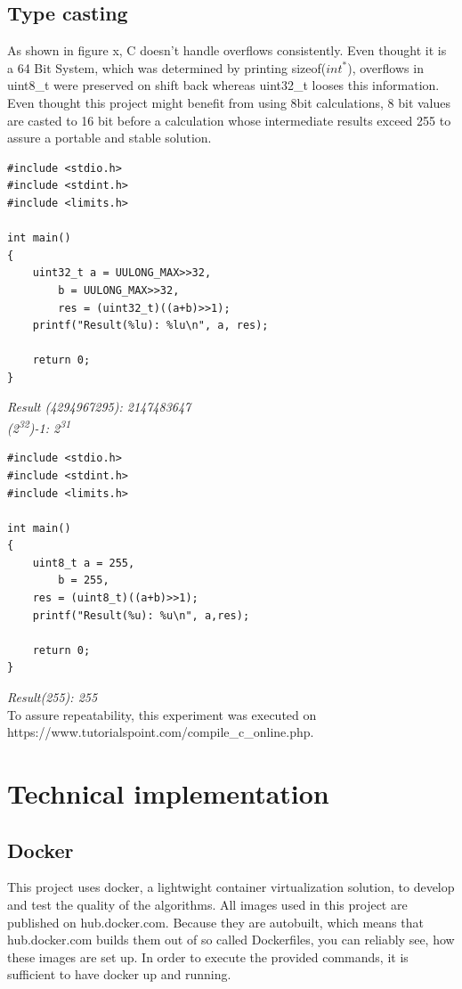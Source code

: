\section{Type casting}
As shown in figure x, C doesn't handle overflows consistently. Even thought it is a 64 Bit System, which was determined by printing sizeof($int^*$), overflows in uint8\_t were preserved on shift back whereas uint32\_t looses this information. Even thought this project might benefit from using 8bit calculations, 8 bit values are casted to 16 bit before a calculation whose intermediate results exceed 255 to assure a portable and stable solution.

\begin{verbatim}
#include <stdio.h>
#include <stdint.h>
#include <limits.h>

int main()
{
	uint32_t a = UULONG_MAX>>32,
		b = UULONG_MAX>>32,
		res = (uint32_t)((a+b)>>1);
	printf("Result(%lu): %lu\n", a, res);
	
	return 0;
}
\end{verbatim}
\textit{ Result (4294967295): 2147483647 \\
	(2\textsuperscript{32})-1: 2\textsuperscript{31}
}
\begin{verbatim}
#include <stdio.h>
#include <stdint.h>
#include <limits.h>

int main()
{
	uint8_t a = 255,
		b = 255,
	res = (uint8_t)((a+b)>>1);
	printf("Result(%u): %u\n", a,res);
	
	return 0;
}

\end{verbatim}
\textit{ Result(255): 255 } \\
To assure repeatability, this experiment was executed on \\ https://www.tutorialspoint.com/compile\_c\_online.php.


\chapter {Technical implementation}
\section{ Docker }
This project uses docker, a lightwight container virtualization solution, to develop and test the quality of the algorithms. All images used in this project are published on hub.docker.com. Because they are autobuilt, which means that hub.docker.com builds them out of so called Dockerfiles, you can reliably see, how these images are set up. In order to execute the provided commands, it is sufficient to have docker up and running.

